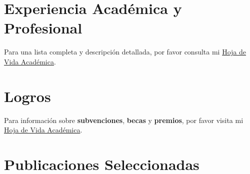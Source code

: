 \documentclass[11pt,a4paper,]{awesome-cv}
\begin{document}
\hypertarget{experiencia-acaduxe9mica-y-profesional}{%
\section{Experiencia Académica y
Profesional}\label{experiencia-acaduxe9mica-y-profesional}}

Para una lista completa y descripción detallada, por favor consulta mi
\href{https://jdleongomez.info/es/files/MVA_CV_es.pdf}{Hoja de Vida
Académica}.

\begin{cventries}
    \vspace{-4.0mm}
    \vspace{-4.0mm}
\end{cventries}

\hypertarget{logros}{%
\section{Logros}\label{logros}}

Para información sobre \textbf{subvenciones}, \textbf{becas} y
\textbf{premios}, por favor visita mi
\href{https://jdleongomez.info/es/files/MVA_CV_es.pdf}{Hoja de Vida
Académica}.

\hypertarget{publicaciones-seleccionadas}{%
\section{Publicaciones
Seleccionadas}\label{publicaciones-seleccionadas}}
\end{document}
